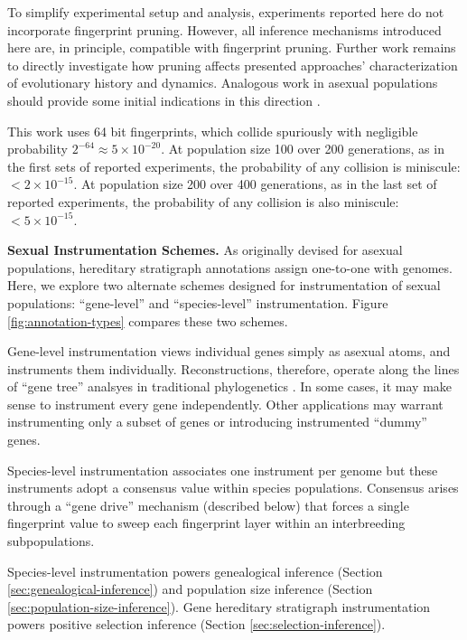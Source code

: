 To simplify experimental setup and analysis, experiments reported here do not incorporate fingerprint pruning.
However, all inference mechanisms introduced here are, in principle, compatible with fingerprint pruning.
Further work remains to directly investigate how pruning affects presented approaches' characterization of evolutionary history and dynamics.
Analogous work in asexual populations should provide some initial indications in this direction \citep{moreno2023toward}.

This work uses 64 bit fingerprints, which collide spuriously with negligible probability $2^{-64} \approx 5 \times 10^{-20}$.
At population size 100 over 200 generations, as in the first sets of reported experiments, the probability of any collision is miniscule: $< 2 \times 10^{-15}$.
At population size 200 over 400 generations, as in the last set of reported experiments, the probability of any collision is also miniscule: $< 5 \times 10^{-15}$.


\textbf{Sexual Instrumentation Schemes.}
As originally devised for asexual populations, hereditary stratigraph annotations assign one-to-one with genomes.
Here, we explore two alternate schemes designed for instrumentation of sexual populations: ``gene-level'' and ``species-level'' instrumentation.
Figure \ref{fig:annotation-types} compares these two schemes.

Gene-level instrumentation views individual genes simply as asexual atoms, and instruments them individually.
Reconstructions, therefore, operate along the lines of ``gene tree'' analsyes in traditional phylogenetics \citep{avise1989gene}.
In some cases, it may make sense to instrument every gene independently.
Other applications may warrant instrumenting only a subset of genes or introducing instrumented ``dummy'' genes.

Species-level instrumentation associates one instrument per genome but these instruments adopt a consensus value within species populations.
Consensus arises through a ``gene drive'' mechanism (described below) that forces a single fingerprint value to sweep each fingerprint layer within an interbreeding subpopulations.

Species-level instrumentation powers genealogical inference (Section \ref{sec:genealogical-inference}) and population size inference (Section \ref{sec:population-size-inference}).
Gene hereditary stratigraph instrumentation powers positive selection inference (Section \ref{sec:selection-inference}).

